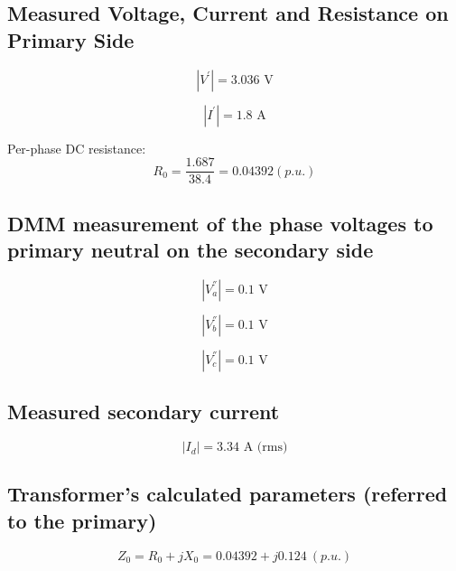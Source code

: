 \documentclass{article}
\begin{document}
\subsection{Measured Voltage, Current and Resistance on Primary Side} 

\begin{equation}
  | V ^{'} | = 3.036 \text{ V}
\end{equation}

\begin{equation}
  | I ^{'} | = 1.8 \text{ A}
\end{equation}

Per-phase DC resistance:
\begin{equation}
  R_0 = \frac{1.687}{38.4} = 0.04392 (p.u.)
\end{equation}

\subsection{DMM measurement of the phase voltages to primary neutral on the secondary side} 

\begin{equation}
  | V ^{''} _{a} | = 0.1 \text{ V}
\end{equation}

\begin{equation}
  | V ^{''} _{b} | = 0.1 \text{ V}
\end{equation}

\begin{equation}
  | V ^{''} _{c} | = 0.1 \text{ V}
\end{equation}

\subsection{Measured secondary current} 

\begin{equation}
  | I _{d} | = 3.34 \text{ A (rms)} 
\end{equation}

\subsection{Transformer's calculated parameters (referred to the primary)} 

\begin{equation}
  Z _0 = R _0 + j X _0 = 0.04392 + j0.124 \ (p.u.) 
\end{equation}
\end{document}
